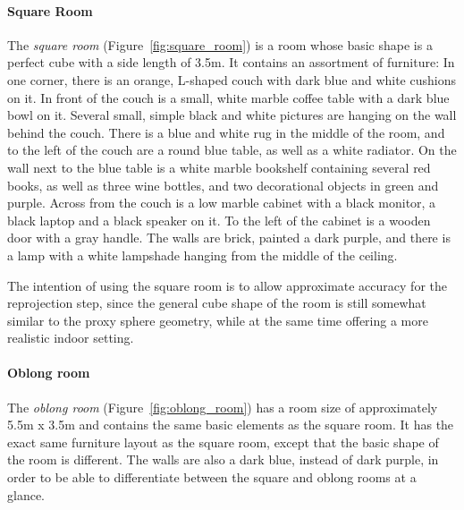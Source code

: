 \paragraph{Square Room}
The \emph{square room} (Figure~\ref{fig:square_room}) is a room whose basic shape is a perfect cube with a side length of 3.5m. It contains an assortment of furniture\footnotemark: In one corner, there is an orange, L-shaped couch with dark blue and white cushions on it. In front of the couch is a small, white marble coffee table with a dark blue bowl on it. Several small, simple black and white pictures are hanging on the wall behind the couch. There is a blue and white rug in the middle of the room, and to the left of the couch are a round blue table, as well as a white radiator. On the wall next to the blue table is a white marble bookshelf containing several red books, as well as three wine bottles, and two decorational objects in green and purple. Across from the couch is a low marble cabinet with a black monitor, a black laptop and a black speaker on it. To the left of the cabinet is a wooden door with a gray handle. The walls are brick, painted a dark purple, and there is a lamp with a white lampshade hanging from the middle of the ceiling.


The intention of using the square room is to allow approximate accuracy for the reprojection step, since the general cube shape of the room is still somewhat similar to the proxy sphere geometry, while at the same time offering a more realistic indoor setting.

\paragraph{Oblong room}
The \emph{oblong room} (Figure~\ref{fig:oblong_room}) has a room size of approximately 5.5m x 3.5m and contains the same basic elements as the square room. It has the exact same furniture layout as the square room, except that the basic shape of the room is different. The walls are also a dark blue, instead of dark purple, in order to be able to differentiate between the square and oblong rooms at a glance.

